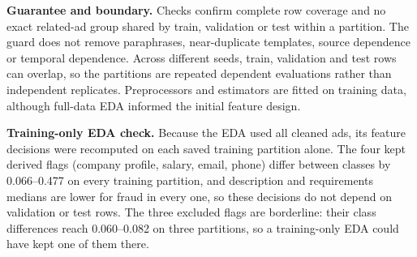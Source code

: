 \textbf{Guarantee and boundary.} Checks confirm complete row coverage and no exact related-ad group
shared by train, validation or test within a partition. The guard does not remove paraphrases,
near-duplicate templates, source dependence or temporal dependence. Across different seeds, train,
validation and test rows can overlap, so the partitions are repeated dependent evaluations rather
than independent replicates. Preprocessors and estimators are fitted on training data, although
full-data EDA informed the initial feature design.

\textbf{Training-only EDA check.} Because the EDA used all cleaned ads, its feature decisions were
recomputed on each saved training partition alone. The four kept derived flags (company profile,
salary, email, phone) differ between classes by 0.066--0.477 on every training partition, and
description and requirements medians are lower for fraud in every one, so these decisions do not
depend on validation or test rows. The three excluded flags are borderline: their class differences
reach 0.060--0.082 on three partitions, so a training-only EDA could have kept one of them there.
